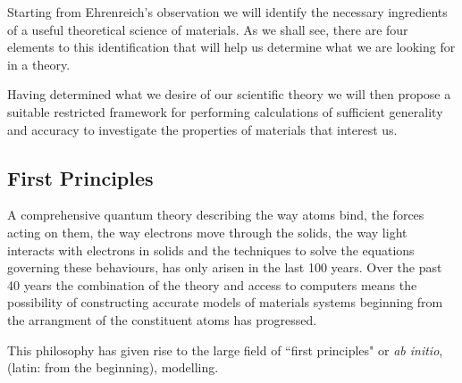Starting from Ehrenreich's observation we will identify
the necessary ingredients of a useful theoretical science of materials. 
As we shall see, there are four
elements to this identification that will help us determine what 
we are looking for in a theory. 

Having determined what we desire of our scientific theory 
we will then propose a suitable restricted framework for performing calculations of
sufficient generality and accuracy to investigate the properties of materials
that interest us.


\subsection{First Principles}
A comprehensive quantum theory describing the way atoms bind, the forces acting on them, 
the way electrons move through the solids, the way light interacts with electrons in solids
and the techniques to solve the equations governing these behaviours, has only 
arisen in the last 100 years. 
%
Over the past 40 years the combination of the theory and access to computers 
means the possibility of constructing accurate models of materials 
systems beginning from the arrangment of the constituent atoms has
progressed. 
%

This philosophy has given rise to the large field of ``first principles" or {\it ab initio}, 
(latin: from the beginning), modelling. 
%


